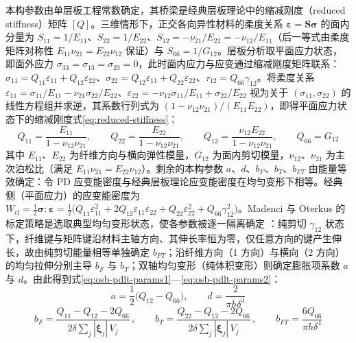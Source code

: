 本构参数由单层板工程常数确定，其桥梁是经典层板理论中的缩减刚度（reduced stiffness）矩阵 $[Q]$。三维情形下，正交各向异性材料的柔度关系 $\boldsymbol{\varepsilon}=\mathbf{S}\boldsymbol{\sigma}$ 的面内分量为 $S_{11}=1/E_{11}$、$S_{22}=1/E_{22}$、$S_{12}=-\nu_{21}/E_{22}=-\nu_{12}/E_{11}$（后一等式由柔度矩阵对称性 $E_{11}\nu_{21}=E_{22}\nu_{12}$ 保证）与 $S_{66}=1/G_{12}$。层板分析取平面应力状态，即面外应力 $\sigma_{33}=\sigma_{13}=\sigma_{23}=0$，此时面内应力与应变通过缩减刚度矩阵联系：$\sigma_{11}=Q_{11}\varepsilon_{11}+Q_{12}\varepsilon_{22}$、$\sigma_{22}=Q_{12}\varepsilon_{11}+Q_{22}\varepsilon_{22}$、$\tau_{12}=Q_{66}\gamma_{12}$。将柔度关系 $\varepsilon_{11}=\sigma_{11}/E_{11}-\nu_{21}\sigma_{22}/E_{22}$、$\varepsilon_{22}=-\nu_{12}\sigma_{11}/E_{11}+\sigma_{22}/E_{22}$ 视为关于 $(\sigma_{11},\sigma_{22})$ 的线性方程组并求逆，其系数行列式为 $(1-\nu_{12}\nu_{21})/(E_{11}E_{22})$，即得平面应力状态下的缩减刚度式\eqref{eq:reduced-stiffness}：
\begin{equation}
  Q_{11}=\frac{E_{11}}{1-\nu_{12}\nu_{21}},\qquad
  Q_{22}=\frac{E_{22}}{1-\nu_{12}\nu_{21}},\qquad
  Q_{12}=\frac{\nu_{12}E_{22}}{1-\nu_{12}\nu_{21}},\qquad
  Q_{66}=G_{12}
  \label{eq:reduced-stiffness}
\end{equation}
其中 $E_{11}$、$E_{22}$ 为纤维方向与横向弹性模量，$G_{12}$ 为面内剪切模量，$\nu_{12}$、$\nu_{21}$ 为主次泊松比（满足 $E_{11}\nu_{21}=E_{22}\nu_{12}$）。剩余的本构参数 $a$、$d$、$b_{F}$、$b_{T}$、$b_{FT}$ 由能量等效确定：令 PD 应变能密度与经典层板理论应变能密度在均匀变形下相等。经典侧（平面应力）的应变能密度为 $W_{\mathrm{cl}}=\tfrac{1}{2}\boldsymbol{\sigma}:\boldsymbol{\varepsilon}=\tfrac{1}{2}\bigl(Q_{11}\varepsilon_{11}^{2}+2Q_{12}\varepsilon_{11}\varepsilon_{22}+Q_{22}\varepsilon_{22}^{2}+Q_{66}\gamma_{12}^{2}\bigr)$。Madenci 与 Oterkus 的标定策略是选取典型均匀变形状态，使各参数被逐一隔离确定 \cite{MadenciOterkus2014}：纯剪切 $\gamma_{12}$ 状态下，纤维键与矩阵键沿材料主轴方向、其伸长率恒为零，仅任意方向的键产生伸长，故由纯剪切能量相等单独确定 $b_{FT}$；沿纤维方向（1 方向）与横向（2 方向）的均匀拉伸分别主导 $b_{F}$ 与 $b_{T}$；双轴均匀变形（纯体积变形）则确定膨胀项系数 $a$ 与 $d$。由此得到式\eqref{eq:osb-pdlt-params1}—\eqref{eq:osb-pdlt-params2}：
\begin{equation}
  a=\frac{1}{2}\bigl(Q_{12}-Q_{66}\bigr),\qquad
  d=\frac{2}{\pi h\delta^{3}}
  \label{eq:osb-pdlt-params1}
\end{equation}
\begin{equation}
  b_{F}=\frac{Q_{11}-Q_{12}-2Q_{66}}{2\delta\sum_{j} |\boldsymbol{\xi}_{j}|\,V_{j}}\,,
  \qquad
  b_{T}=\frac{Q_{22}-Q_{12}-2Q_{66}}{2\delta\sum_{j} |\boldsymbol{\xi}_{j}|\,V_{j}}\,,
  \qquad
  b_{FT}=\frac{6Q_{66}}{\pi h\delta^{4}}
  \label{eq:osb-pdlt-params2}
\end{equation}

